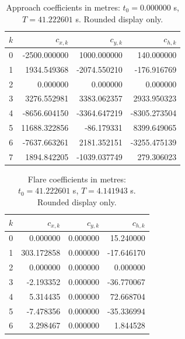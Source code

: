 \begin{table}[H]\centering\small
\caption{Approach coefficients in metres: $t_0=0.000000$ s, $T=41.222601$ s. Rounded display only.}
\begin{tabular}{@{}rrrr@{}}\toprule
$k$ & $c_{x,k}$ & $c_{y,k}$ & $c_{h,k}$\\\midrule
0 & -2500.000000 & 1000.000000 & 140.000000\\
1 & 1934.549368 & -2074.550210 & -176.916769\\
2 & 0.000000 & 0.000000 & 0.000000\\
3 & 3276.552981 & 3383.062357 & 2933.950323\\
4 & -8656.604150 & -3364.647219 & -8305.273504\\
5 & 11688.322856 & -86.179331 & 8399.649065\\
6 & -7637.663261 & 2181.352151 & -3255.475139\\
7 & 1894.842205 & -1039.037749 & 279.306023\\
\bottomrule\end{tabular}\end{table}
\begin{table}[H]\centering\small
\caption{Flare coefficients in metres: $t_0=41.222601$ s, $T=4.141943$ s. Rounded display only.}
\begin{tabular}{@{}rrrr@{}}\toprule
$k$ & $c_{x,k}$ & $c_{y,k}$ & $c_{h,k}$\\\midrule
0 & 0.000000 & 0.000000 & 15.240000\\
1 & 303.172858 & 0.000000 & -17.646170\\
2 & 0.000000 & 0.000000 & 0.000000\\
3 & -2.193352 & 0.000000 & -36.770067\\
4 & 5.314435 & 0.000000 & 72.668704\\
5 & -7.478356 & 0.000000 & -35.336994\\
6 & 3.298467 & 0.000000 & 1.844528\\
\bottomrule\end{tabular}\end{table}
